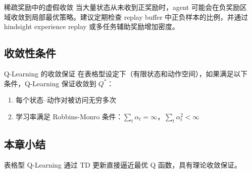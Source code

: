 \begin{warningbox}{稀疏奖励中的虚假收敛}
当大量状态从未收到正奖励时，agent 可能会在负奖励区域收敛到局部最优策略。建议定期检查 replay buffer 中正负样本的比例，并通过 hindsight experience replay 或多任务辅助奖励增加密度。
\end{warningbox}

\subsection{收敛性条件}

\begin{importantbox}{Q-Learning 的收敛保证}
在表格型设定下（有限状态和动作空间），如果满足以下条件，Q-Learning 保证收敛到 $Q^*$：
\begin{enumerate}
    \item 每个状态--动作对被访问无穷多次
    \item 学习率满足 Robbins-Monro 条件：$\sum_t \alpha_t = \infty$，$\sum_t \alpha_t^2 < \infty$
\end{enumerate}
\end{importantbox}

\subsection{本章小结}

表格型 Q-Learning 通过 TD 更新直接逼近最优 Q 函数，具有理论收敛保证。

